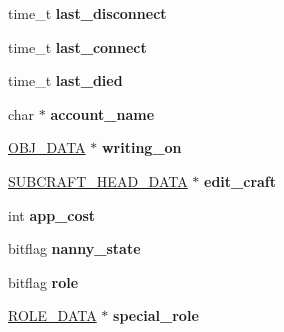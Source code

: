 \begin{DoxyCompactItemize}
\item 
\hypertarget{structpc__data_a2a49a5321a80c9f31ddb943885f5f080}{time\-\_\-t {\bfseries last\-\_\-disconnect}}\label{structpc__data_a2a49a5321a80c9f31ddb943885f5f080}

\item 
\hypertarget{structpc__data_a5c85d570eef22a111a8de987aa3a7d4c}{time\-\_\-t {\bfseries last\-\_\-connect}}\label{structpc__data_a5c85d570eef22a111a8de987aa3a7d4c}

\item 
\hypertarget{structpc__data_ac6e78fcf2207dd2489638962bd793d2f}{time\-\_\-t {\bfseries last\-\_\-died}}\label{structpc__data_ac6e78fcf2207dd2489638962bd793d2f}

\item 
\hypertarget{structpc__data_a5f4d1fc83ffd2a3f2a43387740c3b560}{char $\ast$ {\bfseries account\-\_\-name}}\label{structpc__data_a5f4d1fc83ffd2a3f2a43387740c3b560}

\item 
\hypertarget{structpc__data_af52a407aac34be84c0b0bea0960360a0}{\hyperlink{structobj__data}{O\-B\-J\-\_\-\-D\-A\-T\-A} $\ast$ {\bfseries writing\-\_\-on}}\label{structpc__data_af52a407aac34be84c0b0bea0960360a0}

\item 
\hypertarget{structpc__data_adc6a3f874388e0c85dea779600fc344e}{\hyperlink{structsubcraft__head__data}{S\-U\-B\-C\-R\-A\-F\-T\-\_\-\-H\-E\-A\-D\-\_\-\-D\-A\-T\-A} $\ast$ {\bfseries edit\-\_\-craft}}\label{structpc__data_adc6a3f874388e0c85dea779600fc344e}

\item 
\hypertarget{structpc__data_a21dd830cee78670dd342d4ba8ad48d0b}{int {\bfseries app\-\_\-cost}}\label{structpc__data_a21dd830cee78670dd342d4ba8ad48d0b}

\item 
\hypertarget{structpc__data_af571f39ea0fb995ecdd1a414fec4db62}{bitflag {\bfseries nanny\-\_\-state}}\label{structpc__data_af571f39ea0fb995ecdd1a414fec4db62}

\item 
\hypertarget{structpc__data_a2a24542d1c9e54e9a63c3630bd47c746}{bitflag {\bfseries role}}\label{structpc__data_a2a24542d1c9e54e9a63c3630bd47c746}

\item 
\hypertarget{structpc__data_aa59da91d7b00fa46956d6b89e6467e40}{\hyperlink{structrole__data}{R\-O\-L\-E\-\_\-\-D\-A\-T\-A} $\ast$ {\bfseries special\-\_\-role}}\label{structpc__data_aa59da91d7b00fa46956d6b89e6467e40}


\end{DoxyCompactItemize}
